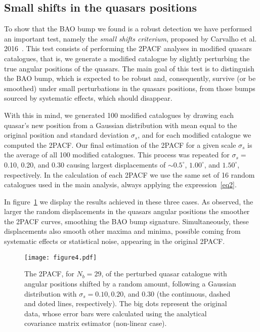 \documentclass[a4paper,11pt]{article}
\begin{document}
\subsection{Small shifts in the quasars positions} \label{sec:small_shift}

\noindent
To show that the BAO bump we found is a robust detection we have performed an important test, 
namely the \textit{small shifts criterium}, proposed by Carvalho et al. 2016~\cite{Carvalho}. 
This test consists of performing the 2PACF analyses in modified quasars catalogues, that is, we generate a modified catalogue by slightly perturbing the true angular positions of the quasars.  
The main goal of this test is to distinguish the BAO bump, which is expected to be robust and, 
consequently, survive (or be smoothed) under small perturbations in the quasars positions, from those bumps sourced by systematic effects, which should disappear. 

With this in mind, we generated 100 modified catalogues by drawing each quasar's new position from a Gaussian distribution with mean equal to the original position and standard deviation $\sigma_s$, and for each modified catalogue we computed the 2PACF. Our final estimation of the 2PACF for a given scale $\sigma_s$ is the average of all 100 modified catalogues. 
This process was repeated for $\sigma_s=$0.10, 0.20, and 0.30 causing largest displacements of 
$\sim 0.5^{\circ}$, $1.00^{\circ}$, and $1.50^{\circ}$, respectively.  In the calculation of each 2PACF we 
use the same set of 16 random catalogues used in the main analysis, always applying the 
expression~\ref{eq2}. 

In figure~\ref{fig4} we display the results achieved in these three cases. 
As observed, the larger the random displacements in the quasars angular positions the smoother the 
2PACF curves, smoothing the BAO bump signature. 
Simultaneously, these displacements also smooth other maxima and minima, possible coming from 
systematic effects or statistical noise, appearing in the original 2PACF. 

\begin{figure}[h]
\centering
\texttt{[image: figure4.pdf]}
\vspace{-0.5cm}
\caption{The 2PACF, for $N_{b}=29$, of the perturbed quasar catalogue with angular positions shifted 
by a random amount, following a Gaussian distribution with $\sigma_s = 0.10, 0.20$, and $0.30$ 
(the continuous, dashed and doted lines, respectively). The big dots represent the original data, 
whose error bars were calculated using the analytical covariance matrix estimator (non-linear case).
} 
\label{fig4}
\end{figure}
\end{document}
